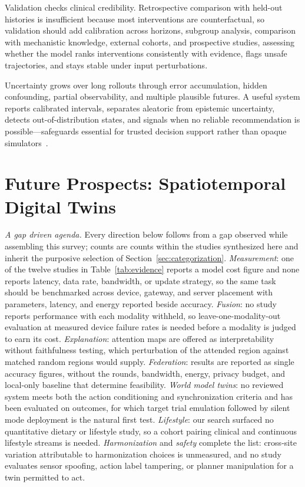 \documentclass[journal]{IEEEtran}
\newif\ifsubmission
\begin{document}
Validation checks clinical credibility. Retrospective comparison with held-out histories is insufficient because most interventions are counterfactual, so validation should add calibration across horizons, subgroup analysis, comparison with mechanistic knowledge, external cohorts, and prospective studies, assessing whether the model ranks interventions consistently with evidence, flags unsafe trajectories, and stays stable under input perturbations.

Uncertainty grows over long rollouts through error accumulation, hidden confounding, partial observability, and multiple plausible futures. A useful system reports calibrated intervals, separates aleatoric from epistemic uncertainty, detects out-of-distribution states, and signals when no reliable recommendation is possible---safeguards essential for trusted decision support rather than opaque simulators~\cite{Sel2025VVUQ}.


\fi

\section{Future Prospects: Spatiotemporal Digital Twins}
\label{sec:future}
\ifsubmission
\emph{A gap driven agenda.} Every direction below follows from a gap observed while assembling this survey; counts are counts within the studies synthesized here and inherit the purposive selection of Section~\ref{sec:categorization}. \emph{Measurement}: one of the twelve studies in Table~\ref{tab:evidence} reports a model cost figure and none reports latency, data rate, bandwidth, or update strategy, so the same task should be benchmarked across device, gateway, and server placement with parameters, latency, and energy reported beside accuracy. \emph{Fusion}: no study reports performance with each modality withheld, so leave-one-modality-out evaluation at measured device failure rates is needed before a modality is judged to earn its cost. \emph{Explanation}: attention maps are offered as interpretability without faithfulness testing, which perturbation of the attended region against matched random regions would supply. \emph{Federation}: results are reported as single accuracy figures, without the rounds, bandwidth, energy, privacy budget, and local-only baseline that determine feasibility. \emph{World model twins}: no reviewed system meets both the action conditioning and synchronization criteria and has been evaluated on outcomes, for which target trial emulation followed by silent mode deployment is the natural first test. \emph{Lifestyle}: our search surfaced no quantitative dietary or lifestyle study, so a cohort pairing clinical and continuous lifestyle streams is needed. \emph{Harmonization} and \emph{safety} complete the list: cross-site variation attributable to harmonization choices is unmeasured, and no study evaluates sensor spoofing, action label tampering, or planner manipulation for a twin permitted to act.
\end{document}
